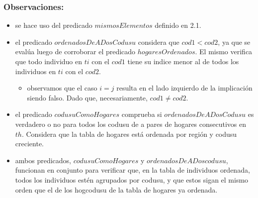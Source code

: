     \subsubsection{Observaciones:}
        \begin{itemize}
            \item se hace uso del predicado $mismosElementos$ definido en 2.1.
            
            \item el predicado $ordenadosDeADosCodusu$ considera que $cod1 < cod2$,  ya que se evalúa luego de corroborar 
            el predicado $hogaresOrdenados$. El mismo verifica que todo individuo en $ti$ con el $cod1$ tiene 
            su indice menor al de todos los individuos en $ti$ con el $cod2$.
                \begin{itemize}
                    \item observamos que el caso $i = j$ resulta en el lado izquierdo de la implicación siendo falso. 
                    Dado que, necesariamente, $cod1 \neq cod2$.
                \end{itemize}

            \item el predicado $codusuComoHogares$ comprueba si $ordenadosDeADosCodusu$ es verdadero o no para todos los 
            codusu de a pares de hogares consecutivos en $th$. Considera que la tabla de hogares está ordenada por regi\'on 
            y codusu creciente.
            
            \item ambos predicados, $codusuComoHogares$ y $ordenadosDeADoscodusu$, funcionan en conjunto para verificar que, 
            en la tabla de individuos ordenada, todos los individuos est\'en agrupados por codusu, 
            y que estos sigan el mismo orden que el de los hogcodusu de la tabla de hogares ya ordenada.
        \end{itemize}
